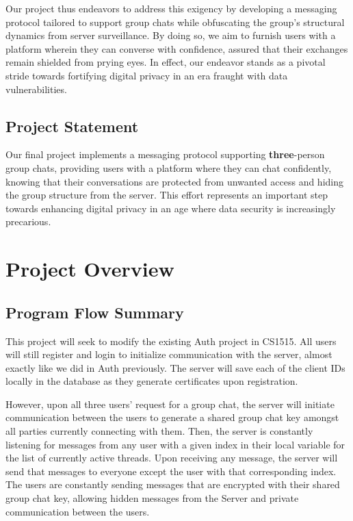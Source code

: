 \documentclass[sigconf]{acmart}
\begin{document}
Our project thus endeavors to address this exigency by developing a messaging protocol tailored to support group chats while obfuscating the group's structural dynamics from server surveillance. By doing so, we aim to furnish users with a platform wherein they can converse with confidence, assured that their exchanges remain shielded from prying eyes. In effect, our endeavor stands as a pivotal stride towards fortifying digital privacy in an era fraught with data vulnerabilities.

\subsection{Project Statement}
Our final project implements a messaging protocol supporting \textbf{three}-person group chats, providing users with a platform where they can chat confidently, knowing that their conversations are protected from unwanted access and hiding the group structure
from the server. This effort represents an important step towards enhancing digital privacy in an age where data security is increasingly precarious.

\section{Project Overview}

\subsection{Program Flow Summary}

This project will seek to modify the existing Auth project in CS1515. All users will still register and login to initialize communication with the server, almost exactly like we did in Auth previously. The server will save each of the client IDs locally in the database as they generate certificates upon registration. 

However, upon all three users' request for a group chat, the server will initiate communication between the users to generate a shared group chat key amongst all parties currently connecting with them. Then, the server is constantly listening for messages from any user with a given index in their local variable for the list of currently active threads. Upon receiving any message, the server will send that messages to everyone except the user with that corresponding index. The users are constantly sending messages that are encrypted with their shared group chat key, allowing hidden messages from the Server and private communication between the users. 
\end{document}
